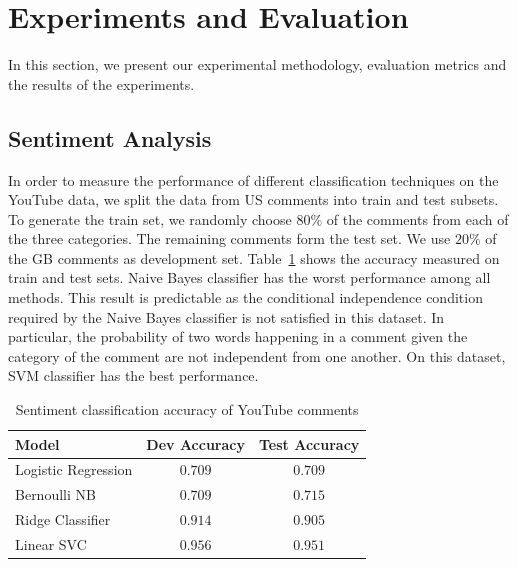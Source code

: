 \section{Experiments and Evaluation}
\label{sec:exp}
In this section, we present our experimental methodology, evaluation metrics and the results of the experiments.

\subsection{Sentiment Analysis}
\label{sec:sent-exp}
In order to measure the performance of different classification techniques on the YouTube data, we split the data from US comments into train and test subsets. To generate the train set, we randomly choose $80\%$ of the comments from each of the three categories. The remaining comments form the test set. We use $20\%$ of the GB comments as development set. 
Table~\ref{tab:accuracy} shows the accuracy measured on train and test sets. Naive Bayes classifier has the worst performance among all methods. This result is predictable as the conditional independence condition required by the Naive Bayes classifier is not satisfied in this dataset. In particular, the probability of two words happening in a comment given the category of the comment are not independent from one another. On this dataset, SVM classifier has the best performance.

\begin{table}%
\centering
\begin{tabular}{|l|c|c|}
\hline
Model & Dev Accuracy & Test Accuracy \\
\hline
Logistic Regression & $0.709$ & $0.709$ \\
\hline
Bernoulli NB & $0.709$ & $0.715$ \\
\hline
Ridge Classifier & $0.914$ & $0.905$ \\
\hline
Linear SVC & $0.956$ & $0.951$ \\
\hline
\end{tabular}
\caption{Sentiment classification accuracy of YouTube comments}
\label{tab:accuracy}
\end{table}

